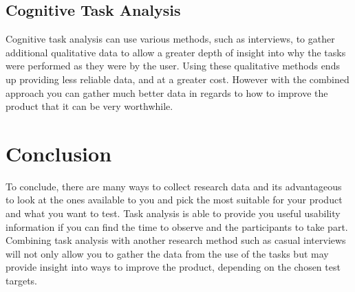 \documentclass{scrartcl}
\begin{document}
	\subsection{Cognitive Task Analysis}
	Cognitive task analysis can use various methods, such as interviews, to gather additional qualitative data to allow a greater depth of insight into why the tasks were performed as they were by the user\citep{clark2007cognitive}. Using these qualitative methods ends up providing less reliable data, and at a greater cost. However with the combined approach you can gather much better data in regards to how to improve the product that it can be very worthwhile\citep{koedinger2016closing}. 
	


	\section{Conclusion}
		To conclude, there are many ways to collect research data and its advantageous to look at the ones available to you and pick the most suitable for your product and what you want to test. Task analysis is able to provide you useful usability information if you can find the time to observe and the participants to take part. Combining task analysis with another research method such as casual interviews will not only allow you to gather the data from the use of the tasks but may provide insight into ways to improve the product, depending on the chosen test targets.

	
	
	
	
\end{document}
